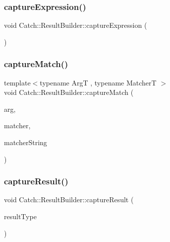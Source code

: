 \mbox{\label{class_catch_1_1_result_builder_af2ae2343965802eeeb0abbd4ea9d2d36}} 
\subsubsection{\texorpdfstring{capture\+Expression()}{captureExpression()}}
{\footnotesize\ttfamily void Catch\+::\+Result\+Builder\+::capture\+Expression (\begin{DoxyParamCaption}{ }\end{DoxyParamCaption})}

\mbox{\label{class_catch_1_1_result_builder_a27425538bec8fee7ac69403c5df6078c}} 
\subsubsection{\texorpdfstring{capture\+Match()}{captureMatch()}}
{\footnotesize\ttfamily template$<$typename ArgT , typename MatcherT $>$ \\
void Catch\+::\+Result\+Builder\+::capture\+Match (\begin{DoxyParamCaption}\item[{ArgT const \&}]{arg,  }\item[{MatcherT const \&}]{matcher,  }\item[{char const $\ast$}]{matcher\+String }\end{DoxyParamCaption})\hspace{0.3cm}{\ttfamily [inline]}}

\mbox{\label{class_catch_1_1_result_builder_a10e467f7b7a4976e5d148b4d5066e8fd}} 
\subsubsection{\texorpdfstring{capture\+Result()}{captureResult()}}
{\footnotesize\ttfamily void Catch\+::\+Result\+Builder\+::capture\+Result (\begin{DoxyParamCaption}\item[{\mbox{\hyperlink{struct_catch_1_1_result_was_a624e1ee3661fcf6094ceef1f654601ef}{Result\+Was\+::\+Of\+Type}}}]{result\+Type }\end{DoxyParamCaption})}

